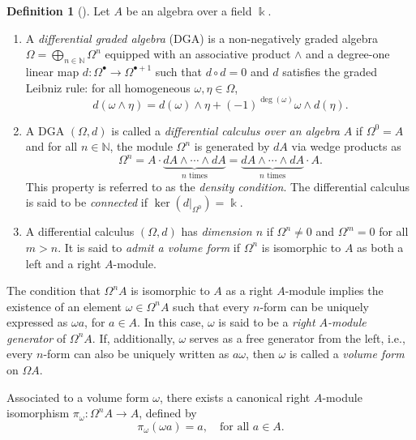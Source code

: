\documentclass{amsart}
\theoremstyle{definition}
\newtheorem{definition}[theorem]{Definition}
\theoremstyle{remark}
\numberwithin{equation}{section}
\begin{document}
\begin{definition}[{\cite[Section~2.1]{BrzezinskiSitarz2017}}]
Let $A$ be an algebra over a field $\Bbbk$.
\begin{enumerate}
    \item[\rm (i)] A \emph{differential graded algebra} (DGA) is a non-negatively graded algebra $\Omega = \bigoplus_{n \in \mathbb{N}} \Omega^n$ equipped with an associative product $\wedge$ and a degree-one linear map $d: \Omega^\bullet \to \Omega^{\bullet +1}$ such that $d \circ d = 0$ and $d$ satisfies the graded Leibniz rule: for all homogeneous $\omega, \eta \in \Omega$,
    \[
    d(\omega \wedge \eta) = d(\omega) \wedge \eta + (-1)^{\deg(\omega)} \omega \wedge d(\eta).
    \]
    
    \item[\rm (ii)] A DGA $(\Omega, d)$ is called a \emph{differential calculus over an algebra} $A$ if $\Omega^0 = A$ and for all $n \in \mathbb{N}$, the module $\Omega^n$ is generated by $dA$ via wedge products as
    \[
    \Omega^n = A \cdot \underbrace{dA \wedge \dotsb \wedge dA}_{n\text{ times}} = \underbrace{dA \wedge \dotsb \wedge dA}_{n\text{ times}} \cdot A.
    \]
    This property is referred to as the \emph{density condition}. The differential calculus is said to be \emph{connected} if $\ker(d|_{\Omega^0}) = \Bbbk$.
    
    \item[\rm (iii)] A differential calculus $(\Omega, d)$ has \emph{dimension $n$} if $\Omega^n \neq 0$ and $\Omega^m = 0$ for all $m > n$. It is said to \emph{admit a volume form} if $\Omega^n$ is isomorphic to $A$ as both a left and a right $A$-module.
\end{enumerate}
\end{definition}


The condition that $\Omega^n A$ is isomorphic to $A$ as a right $A$-module implies the existence of an element $\omega \in \Omega^n A$ such that every $n$-form can be uniquely expressed as $\omega a$, for $a \in A$. In this case, $\omega$ is said to be a \emph{right $A$-module generator} of $\Omega^n A$. If, additionally, $\omega$ serves as a free generator from the left, i.e., every $n$-form can also be uniquely written as $a \omega$, then $\omega$ is called a \emph{volume form} on $\Omega A$.

Associated to a volume form $\omega$, there exists a canonical right $A$-module isomorphism $\pi_{\omega}: \Omega^n A \to A$, defined by
\begin{equation}\label{BrzezinskiSitarz20172.1}
    \pi_{\omega}(\omega a) = a, \quad \text{for all } a \in A.
\end{equation}
\end{document}
